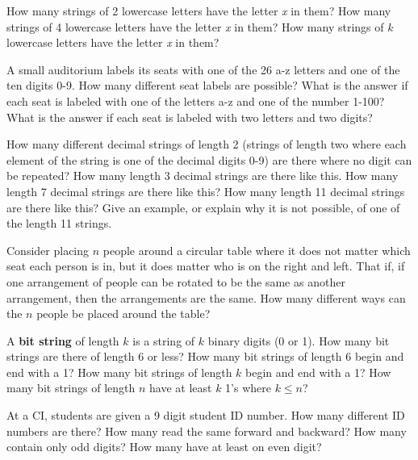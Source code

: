 \begin{exercise}
How many strings of 2 lowercase letters have the letter \emph{x} in them? How many strings of 4 lowercase letters have the letter \emph{x} in them? How many strings of $k$ lowercase letters have the letter \emph{x} in them?
\end{exercise}

\begin{exercise}
A small auditorium labels its seats with one of the 26 a-z letters and one of the ten digits 0-9.  How many different seat labels are possible? What is the answer if each seat is labeled with one of the letters a-z and one of the number 1-100?  What is the answer if each seat is labeled with two letters and two digits?
\end{exercise}

\begin{exercise}
How many different decimal strings of length 2 (strings of length two where each element of the string is one of the decimal digits 0-9) are there where no digit can be repeated?  How many length 3 decimal strings are there like this.  How many length 7 decimal strings are there like this?  How many length 11 decimal strings are there like this?  Give an example, or explain why it is not possible, of one of the length 11 strings.
\end{exercise}

\begin{exercise} 
Consider placing $n$ people around a circular table where it does not matter which seat each person is in, but it does matter who is on the right and left.  That if, if one arrangement of people can be rotated to be the same as another arrangement, then the arrangements are the same.  How many different ways can the $n$ people be placed around the table?
\end{exercise}

\begin{exercise} 
A {\bf bit string} of length $k$ is a string of $k$ binary digits (0 or 1).  How many bit strings are there of length 6 or less?  How many bit strings of length 6 begin and end with a 1?  How many bit strings of length $k$ begin and end with a 1? How many bit strings of length $n$ have at least $k$ 1's where $k \le n$?
\end{exercise}

\begin{exercise} 
At a CI, students are given a 9 digit student ID number.  How many different ID numbers are there?  How many read the same forward and backward?  How many contain only odd digits? How many have at least on even digit?
\end{exercise}

